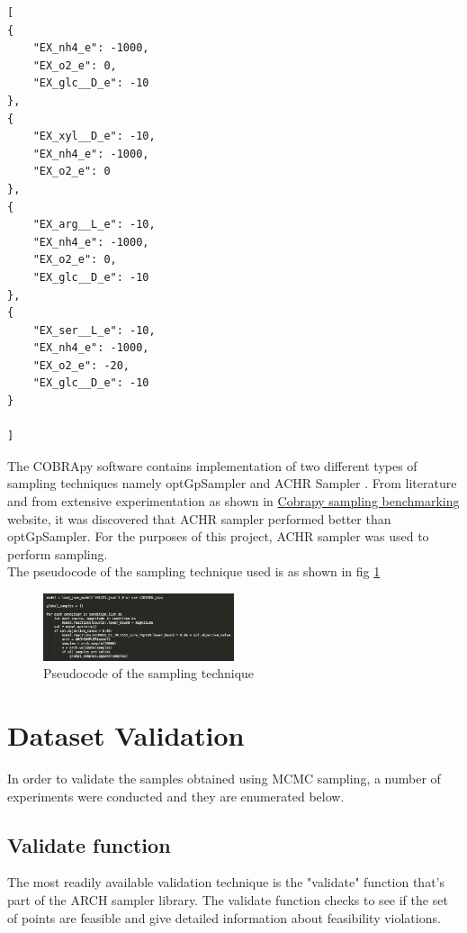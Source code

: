 \documentclass[12pt,chapterheads]{ucsd}
\begin{document}
\begin{spacing}{1}
\begin{lstlisting}[caption={Sampling conditions}, label={lst:sample_conds}]
[
{
    "EX_nh4_e": -1000,
    "EX_o2_e": 0,
    "EX_glc__D_e": -10
},
{
    "EX_xyl__D_e": -10,
    "EX_nh4_e": -1000,
    "EX_o2_e": 0
},
{
    "EX_arg__L_e": -10,
    "EX_nh4_e": -1000,
    "EX_o2_e": 0,
    "EX_glc__D_e": -10
},
{
    "EX_ser__L_e": -10,
    "EX_nh4_e": -1000,
    "EX_o2_e": -20,
    "EX_glc__D_e": -10
}

]
\end{lstlisting}
\end{spacing}

The COBRApy software contains implementation of two different types of sampling techniques namely optGpSampler \cite{10.1371/journal.pone.0086587} and ACHR Sampler \cite{Thiele25032005}. From literature and from extensive experimentation as shown in \href{https://github.com/cdiener/cobra-docker/blob/master/sampling_benchmark.ipynb}{Cobrapy sampling benchmarking} website, it was discovered that ACHR sampler performed better than optGpSampler. For the purposes of this project, ACHR sampler was used to perform sampling.\\
The pseudocode of the sampling technique used is as shown in fig \ref{fig:sampling_pseudo}

\begin{figure}[h] 
\centering
\includegraphics[width=0.5\textwidth]{sampling_pseudo}
\caption[Sampling pseudocode]
{Pseudocode of the sampling technique}
\label{fig:sampling_pseudo}
\end{figure}


\section{Dataset Validation}
In order to validate the samples obtained using MCMC sampling, a number of experiments were conducted and they are enumerated below.
\subsection{Validate function}
The most readily available validation technique is the "validate" function that's part of the ARCH sampler library. The validate function checks to see if the set of points are feasible and give detailed information about feasibility violations. 
\end{document}
